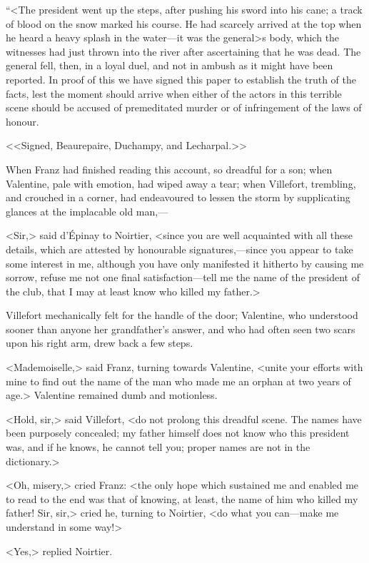  “<The president went up the steps, after pushing his sword into his cane; a track of blood on the snow marked his course. He had scarcely arrived at the top when he heard a heavy splash in the water—it was the general>s body, which the witnesses had just thrown into the river after ascertaining that he was dead. The general fell, then, in a loyal duel, and not in ambush as it might have been reported. In proof of this we have signed this paper to establish the truth of the facts, lest the moment should arrive when either of the actors in this terrible scene should be accused of premeditated murder or of infringement of the laws of honour. 

 <<Signed, Beaurepaire, Duchampy, and Lecharpal.>> 

 When Franz had finished reading this account, so dreadful for a son; when Valentine, pale with emotion, had wiped away a tear; when Villefort, trembling, and crouched in a corner, had endeavoured to lessen the storm by supplicating glances at the implacable old man,— 

 <Sir,> said d'Épinay to Noirtier, <since you are well acquainted with all these details, which are attested by honourable signatures,—since you appear to take some interest in me, although you have only manifested it hitherto by causing me sorrow, refuse me not one final satisfaction—tell me the name of the president of the club, that I may at least know who killed my father.> 

 Villefort mechanically felt for the handle of the door; Valentine, who understood sooner than anyone her grandfather's answer, and who had often seen two scars upon his right arm, drew back a few steps. 

 <Mademoiselle,> said Franz, turning towards Valentine, <unite your efforts with mine to find out the name of the man who made me an orphan at two years of age.> Valentine remained dumb and motionless. 

 <Hold, sir,> said Villefort, <do not prolong this dreadful scene. The names have been purposely concealed; my father himself does not know who this president was, and if he knows, he cannot tell you; proper names are not in the dictionary.> 

 <Oh, misery,> cried Franz: <the only hope which sustained me and enabled me to read to the end was that of knowing, at least, the name of him who killed my father! Sir, sir,> cried he, turning to Noirtier, <do what you can—make me understand in some way!> 

 <Yes,> replied Noirtier. 

